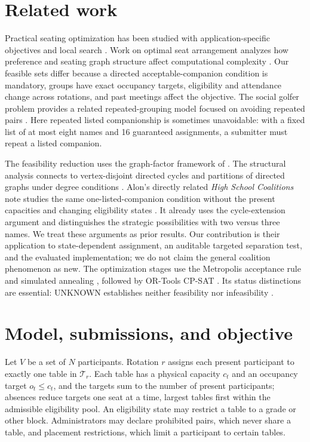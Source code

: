 \documentclass[11pt,a4paper]{article}
\theoremstyle{definition}\newtheorem{definition}[theorem]{Definition}
\theoremstyle{remark}\newtheorem{remark}[theorem]{Remark}
\begin{document}
\section{Related work}
Practical seating optimization has been studied with application-specific objectives and local search \citep{lewis2016seating}. Work on optimal seat arrangement analyzes how preference and seating graph structure affect computational complexity \citep{ceylan2023seat}. Our feasible sets differ because a directed acceptable-companion condition is mandatory, groups have exact occupancy targets, eligibility and attendance change across rotations, and past meetings affect the objective. The social golfer problem provides a related repeated-grouping model focused on avoiding repeated pairs \citep{dotu2005golfers}. Here repeated listed companionship is sometimes unavoidable: with a fixed list of at most eight names and 16 guaranteed assignments, a submitter must repeat a listed companion.

The feasibility reduction uses the graph-factor framework of \citet{kirkpatrick1983factor}. The structural analysis connects to vertex-disjoint directed cycles \citep{thomassen1983} and partitions of directed graphs under degree conditions \citep{alon2006splitting}. Alon's directly related \emph{High School Coalitions} note studies the same one-listed-companion condition without the present capacities and changing eligibility states \citep{aloncoalitions}. It already uses the cycle-extension argument and distinguishes the strategic possibilities with two versus three names. We treat these arguments as prior results. Our contribution is their application to state-dependent assignment, an auditable targeted separation test, and the evaluated implementation; we do not claim the general coalition phenomenon as new. The optimization stages use the Metropolis acceptance rule and simulated annealing \citep{metropolis1953,kirkpatrick1983annealing}, followed by OR-Tools CP-SAT \citep{ortools}. Its status distinctions are essential: UNKNOWN establishes neither feasibility nor infeasibility \citep{cpsatstatus}.

\section{Model, submissions, and objective}\label{sec:model}
Let $V$ be a set of $N$ participants. Rotation $r$ assigns each present participant to exactly one table in $\mathcal T_r$. Each table has a physical capacity $c_t$ and an occupancy target $o_t\le c_t$, and the targets sum to the number of present participants; absences reduce targets one seat at a time, largest tables first within the admissible eligibility pool. An eligibility state may restrict a table to a grade or other block. Administrators may declare prohibited pairs, which never share a table, and placement restrictions, which limit a participant to certain tables.
\end{document}
